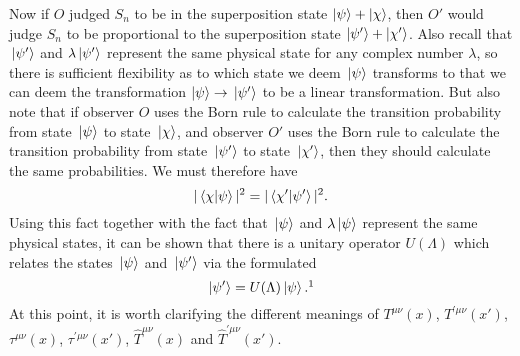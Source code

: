 Now if  $O$ judged $S_n$ to be in the superposition state $\ket{\psi}+\ket{\chi}$, then $O'$ would judge $S_n$ to be proportional to the superposition state $\ket{\psi'}+\ket{\chi'}$. Also recall that $\ket*{\psi'}$ and $\lambda\ket*{\psi'}$ represent the same physical state for any complex number $\lambda$, so there is sufficient flexibility as to which state we deem $\ket*{\psi}$ transforms to that we can deem the transformation $\ket{\psi}\rightarrow\ket*{\psi'}$ to be a linear transformation. But also note that if observer $O$ uses the Born rule to calculate the transition probability from state $\ket*{\psi}$ to state $\ket*{\chi}$, and  observer $O'$ uses the Born rule to calculate the transition probability from state $\ket*{\psi'}$ to state $\ket*{\chi'}$, then they should calculate the same probabilities. We must therefore have
$$|\ip*{\chi}{\psi}|^2=|\ip*{\chi'}{\psi'}|^2.$$
Using this fact together with the fact that $\ket*{\psi}$ and $\lambda\ket*{\psi}$ represent the same physical states, it can be shown that there is a unitary operator $U(\Lambda)$ which relates the states $\ket*{\psi}$ and $\ket*{\psi'}$ via the formulated
$$\ket*{\psi'}=U(\Lambda)\ket*{\psi}.\protect\footnotemark$$At this point, it is worth clarifying the different meanings of $T^{\mu\nu}(x)$, $T^{\prime\mu\nu}(x')$, $\tau^{\mu\nu}(x)$, $\tau^{\prime\mu\nu}(x')$,  $\hat{T}^{\mu\nu}(x)$ and $\hat{T}^{\prime\mu\nu}(x')$. 
